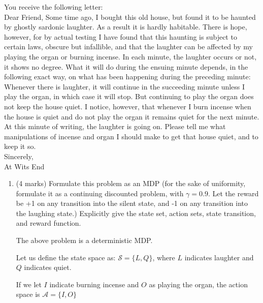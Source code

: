 \documentclass[addpoints,12pt,solution]{exam}
\begin{document}
\begin{questions}
\begin{enumerate}[label=(\alph*)]
\begin{solution}
            \end{solution}

        \end{enumerate}

         You receive the following letter:\\
        Dear Friend, Some time ago, I bought this old house, but found it to be haunted by
        ghostly sardonic laughter. As a result it is hardly habitable. There is hope, however,
        for by actual testing I have found that this haunting is subject to certain laws, obscure
        but infallible, and that the laughter can be affected by my playing the organ or burning
        incense. In each minute, the laughter occurs or not, it shows no degree. What it will
        do during the ensuing minute depends, in the following exact way, on what has been
        happening during the preceding minute: Whenever there is laughter, it will continue in
        the succeeding minute unless I play the organ, in which case it will stop. But continuing
        to play the organ does not keep the house quiet. I notice, however, that whenever I
        burn incense when the house is quiet and do not play the organ it remains quiet for the
        next minute. At this minute of writing, the laughter is going on. Please tell me what
        manipulations of incense and organ I should make to get that house quiet, and to keep
        it so.\\
        Sincerely,\\
        At Wits End

        \begin{enumerate}[label=(\alph*)]

            \item (4 marks) Formulate this problem as an MDP (for the sake of uniformity, formulate it as a
            continuing discounted problem, with $\gamma= 0.9$. Let the reward be +1 on any transition
            into the silent state, and -1 on any transition into the laughing state.) Explicitly give the
            state set, action sets, state transition, and reward function.

            \begin{solution}
                The above problem is a deterministic MDP.

                Let us define the state space as: $\mathcal{S} = \{L, Q\}$,
                where $L$ indicates laughter and $Q$ indicates quiet.

                If we let $I$ indicate burning incense and $O$ as playing the organ, the action space is $\mathcal{A} = \{I, O\}$


\end{solution}
\end{enumerate}
\end{questions}
\end{document}
